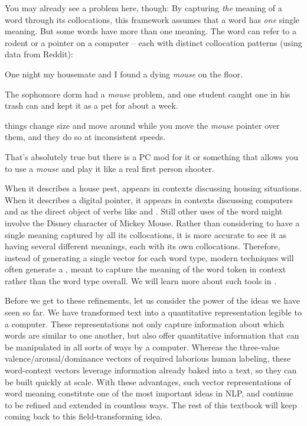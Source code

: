 You may already see a problem here, though: By capturing \emph{the} meaning of a word through its collocations, this framework assumes that a word has \emph{one} single meaning.  But some words have more than one meaning.  The word  can refer to a rodent or a pointer on a computer -- each with distinct collocation patterns (using data from Reddit):

\ea One night my housemate and I found a dying \emph{mouse} on the floor.

\ex The sophomore dorm had a \emph{mouse} problem, and one student caught one in his trash can and kept it as a pet for about a week.


\ex things change size and move around while you move the \emph{mouse} pointer over them, and they do so at inconsistent speeds.

\ex That's absolutely true but there is a PC mod for it or something that allows you to use a \emph{mouse} and play it like a real first person shooter.

\z

When it describes a  house pest,  appears in contexts discussing housing situations.  When it describes a digital pointer, it appears in contexts discussing computers and as the direct object of verbs like  and .  Still other uses of the word  might involve the Disney character of Mickey Mouse.  Rather than considering  to have a single meaning captured by all its collocations, it is more accurate to see it as having several different meanings, each with its own collocations.  Therefore, instead of generating a single vector for each word type, modern techniques will often generate a , meant to capture the meaning of the word token in context rather than the word type overall.  We will learn more about such tools in .

Before we get to these refinements, let us consider the power of the ideas we have seen so far.   We have transformed text into a quantitative
representation legible to a computer.  These representations not only
capture information about which words are similar to one another, but
also offer quantitative information that can be manipulated in all
sorts of ways by a computer.  Whereas the three-value
valence/arousal/dominance vectors of \citet{Osgood-etal:1957}  required
laborious human labeling, these word-context vectors leverage
information already baked into a text, so they can be built quickly at
scale.  With these advantages, such vector representations of word
meaning constitute one of the most important ideas in NLP, and continue to be refined and extended in countless ways.
The rest of this textbook will keep coming back to this
field-transforming idea.

